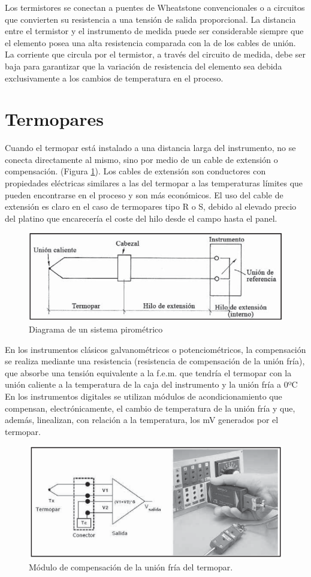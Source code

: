 Los termistores se conectan a puentes de Wheatstone convencionales o a circuitos que convierten su resistencia a una tensión de salida proporcional. La distancia entre el termistor y el instrumento de medida puede ser considerable siempre que el elemento posea una alta resistencia comparada con la de los cables de unión. La corriente que circula por el termistor, a través del circuito de medida, debe ser baja para garantizar que la variación de resistencia del elemento sea debida exclusivamente a los cambios de temperatura en el proceso.

\section{Termopares}

Cuando el termopar está instalado a una distancia larga del instrumento, no se conecta directamente al mismo, sino por medio de un cable de extensión o compensación. (Figura \ref{fig:termopares}). Los cables de extensión son conductores con propiedades eléctricas similares a las del termopar a las temperaturas límites que pueden encontrarse en el proceso y son más económicos. El uso del cable de extensión es claro en el caso de termopares tipo R o S, debido al elevado precio del platino que encarecería el coste del hilo desde el campo hasta el panel.

\begin{figure}[H]
    \centering
    \includegraphics[width=0.5\linewidth]{Imagenes/Termopares.png}
    \caption{Diagrama de un sistema pirométrico}
    \label{fig:termopares}
\end{figure}

En los instrumentos clásicos galvanométricos o potenciométricos, la compensación se realiza mediante una resistencia (resistencia de compensación de la unión fría), que absorbe una tensión equivalente a la f.e.m. que tendría el termopar con la unión caliente a la temperatura de la caja del instrumento y la unión fría a 0ºC
En los instrumentos digitales se utilizan módulos de acondicionamiento que compensan, electrónicamente, el cambio de temperatura de la unión fría y que, además, linealizan, con relación a la temperatura, los mV generados por el termopar.
\begin{figure}
    \centering
    \includegraphics[width=0.5\linewidth]{Imagenes/Termopar.png}
    \caption{Módulo de compensación de la unión fría del termopar.}
    \label{fig:enter-label}
\end{figure}

